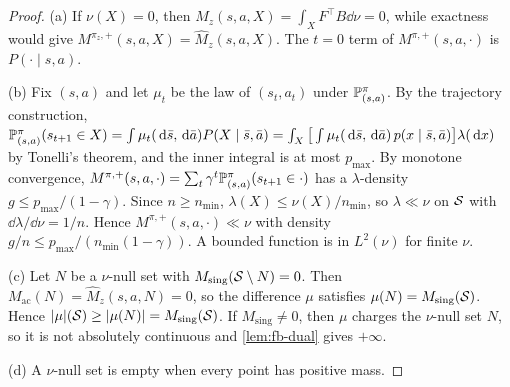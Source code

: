 \begin{proof}
(a) If $\nu(X)=0$, then $\hat M_z(s,a,X)=\int_XF^\top B\dd\nu=0$, while exactness would give $M^{\pi_z,+}(s,a,X)=\hat M_z(s,a,X)$.
The $t=0$ term of $M^{\pi,+}(s,a,\cdot)$ is $P(\cdot\mid s,a)$.

(b) Fix $(s,a)$ and let $\mu_t$ be the law of $(s_t,a_t)$ under $\mathbb{P}^\pi_{(s,a)}$.
By the trajectory construction, $\mathbb{P}^\pi_{(s,a)}(s_{t+1}\in X)=\int\mu_t(\,\mathrm{d}\bar s,\,\mathrm{d}\bar a)P(X\mid\bar s,\bar a)=\int_X\big[\int\mu_t(\,\mathrm{d}\bar s,\,\mathrm{d}\bar a)\,p(x\mid\bar s,\bar a)\big]\lambda(\,\mathrm{d} x)$ by Tonelli's theorem, and the inner integral is at most $p_{\max}$.
By monotone convergence, $M^{\pi,+}(s,a,\cdot)=\sum_t\gamma^t\mathbb{P}^\pi_{(s,a)}(s_{t+1}\in\cdot)$ has a $\lambda$-density $g\le p_{\max}/(1-\gamma)$.
Since $n\ge n_{\min}$, $\lambda(X)\le\nu(X)/n_{\min}$, so $\lambda\ll\nu$ on $\mathcal{S}$ with $\dd\lambda/\dd\nu=1/n$. Hence $M^{\pi,+}(s,a,\cdot)\ll\nu$ with density $g/n\le p_{\max}/(n_{\min}(1-\gamma))$.
A bounded function is in $L^2(\nu)$ for finite $\nu$.

(c) Let $N$ be a $\nu$-null set with $M_{\mathrm{sing}}(\mathcal{S}\setminus N)=0$. Then $M_{\mathrm{ac}}(N)=\hat M_z(s,a,N)=0$, so the difference $\mu$ satisfies $\mu(N)=M_{\mathrm{sing}}(\mathcal{S})$.
Hence $|\mu|(\mathcal{S})\ge|\mu(N)|=M_{\mathrm{sing}}(\mathcal{S})$. If $M_{\mathrm{sing}}\ne0$, then $\mu$ charges the $\nu$-null set $N$, so it is not absolutely continuous and \cref{lem:fb-dual} gives $+\infty$.

(d) A $\nu$-null set is empty when every point has positive mass.
\end{proof}

